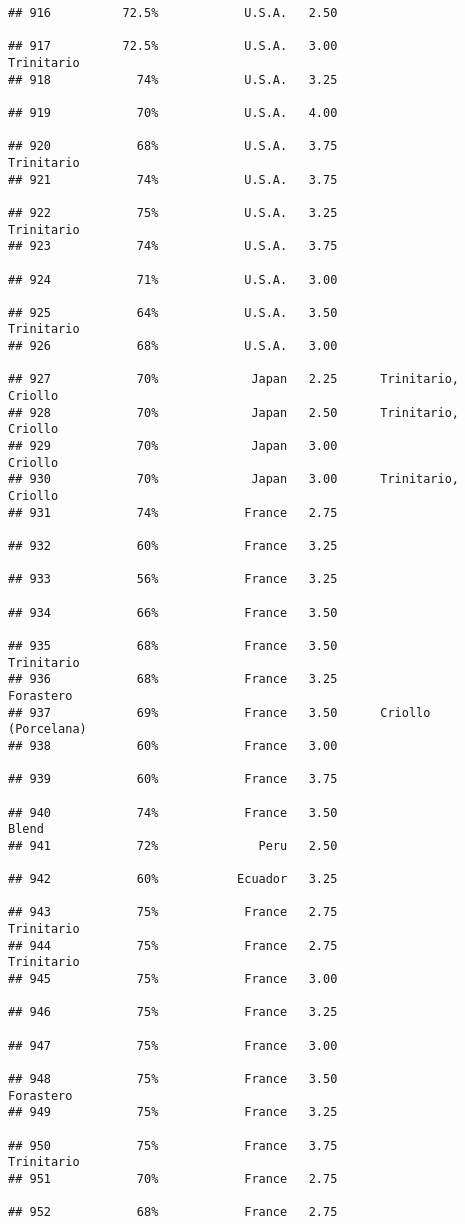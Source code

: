 \documentclass[
]{article}
\begin{document}
\begin{verbatim}
## 916          72.5%            U.S.A.   2.50                         
## 917          72.5%            U.S.A.   3.00               Trinitario
## 918            74%            U.S.A.   3.25                         
## 919            70%            U.S.A.   4.00                         
## 920            68%            U.S.A.   3.75               Trinitario
## 921            74%            U.S.A.   3.75                         
## 922            75%            U.S.A.   3.25               Trinitario
## 923            74%            U.S.A.   3.75                         
## 924            71%            U.S.A.   3.00                         
## 925            64%            U.S.A.   3.50               Trinitario
## 926            68%            U.S.A.   3.00                         
## 927            70%             Japan   2.25      Trinitario, Criollo
## 928            70%             Japan   2.50      Trinitario, Criollo
## 929            70%             Japan   3.00                  Criollo
## 930            70%             Japan   3.00      Trinitario, Criollo
## 931            74%            France   2.75                         
## 932            60%            France   3.25                         
## 933            56%            France   3.25                         
## 934            66%            France   3.50                         
## 935            68%            France   3.50               Trinitario
## 936            68%            France   3.25                Forastero
## 937            69%            France   3.50      Criollo (Porcelana)
## 938            60%            France   3.00                         
## 939            60%            France   3.75                         
## 940            74%            France   3.50                    Blend
## 941            72%              Peru   2.50                         
## 942            60%           Ecuador   3.25                         
## 943            75%            France   2.75               Trinitario
## 944            75%            France   2.75               Trinitario
## 945            75%            France   3.00                         
## 946            75%            France   3.25                         
## 947            75%            France   3.00                         
## 948            75%            France   3.50                Forastero
## 949            75%            France   3.25                         
## 950            75%            France   3.75               Trinitario
## 951            70%            France   2.75                         
## 952            68%            France   2.75                         

\end{verbatim}
\end{document}
